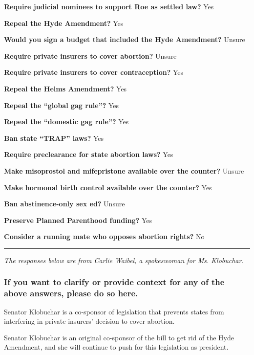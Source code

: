 \textbf{Require judicial nominees to support Roe as settled law?} Yes

\textbf{Repeal the Hyde Amendment?} Yes

\textbf{Would you sign a budget that included the Hyde Amendment?}
Unsure

\textbf{Require private insurers to cover abortion?} Unsure

\textbf{Require private insurers to cover contraception?} Yes

\textbf{Repeal the Helms Amendment?} Yes

\textbf{Repeal the ``global gag rule''?} Yes

\textbf{Repeal the ``domestic gag rule''?} Yes

\textbf{Ban state ``TRAP'' laws?} Yes

\textbf{Require preclearance for state abortion laws?} Yes

\textbf{Make misoprostol and mifepristone available over the counter?}
Unsure

\textbf{Make hormonal birth control available over the counter?} Yes

\textbf{Ban abstinence-only sex ed?} Unsure

\textbf{Preserve Planned Parenthood funding?} Yes

\textbf{Consider a running mate who opposes abortion rights?} No

\begin{center}\rule{0.5\linewidth}{\linethickness}\end{center}

\emph{The responses below are from Carlie Waibel, a spokeswoman for Ms.
Klobuchar.}

\hypertarget{if-you-want-to-clarify-or-provide-context-for-any-of-the-above-answers-please-do-so-here-3}{%
\subsubsection{If you want to clarify or provide context for any of the
above answers, please do so
here.}\label{if-you-want-to-clarify-or-provide-context-for-any-of-the-above-answers-please-do-so-here-3}}

Senator Klobuchar is a co-sponsor of legislation that prevents states
from interfering in private insurers' decision to cover abortion.

Senator Klobuchar is an original co-sponsor of the bill to get rid of
the Hyde Amendment, and she will continue to push for this legislation
as president.

